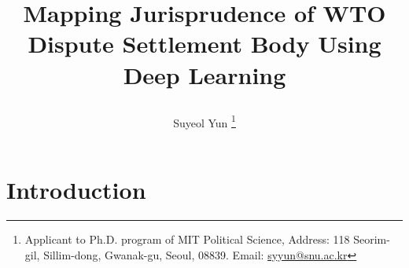\documentclass[12pt,letterpaper]{article}
\newcommand{\tit}{
\bf 
Mapping Jurisprudence of WTO Dispute Settlement Body Using Deep Learning
}
\newcommand\spacingset[1]{\renewcommand{\baselinestretch}
{#1}\small\normalsize}
\begin{document}
\spacingset{1.25}

\setcounter{page}{0}
\vspace{-.1in}

{\title{
    \tit
  }
  \author{Suyeol Yun
  \thanks{Applicant to Ph.D. program of MIT Political Science,
  Address: 118 Seorim-gil, Sillim-dong, Gwanak-gu, Seoul,
  08839. Email: \href{mailto:syyun@snu.ac.kr}{syyun@snu.ac.kr}
  }
  }
  \maketitle
}

\thispagestyle{empty}
\vspace{-.1in}

\begin{abstract}
  
\end{abstract}

\spacingset{1.5} %

\clearpage

\section{Introduction}










% 

% 

% 
\end{document}
